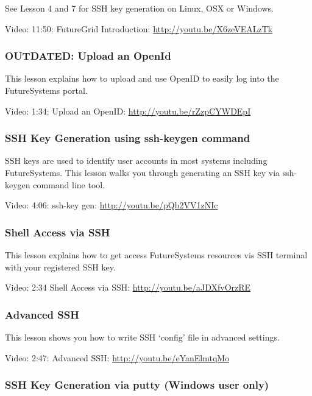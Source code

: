 See Lesson 4 and 7 for SSH key generation on Linux, OSX or Windows.

Video: 11:50: FutureGrid Introduction: \url{http://youtu.be/X6zeVEALzTk}

\subsubsection{OUTDATED: Upload an
OpenId}\label{outdated-upload-an-openid}

This lesson explains how to upload and use OpenID to easily log into the
FutureSystems portal.

Video: 1:34: Upload an OpenID: \url{http://youtu.be/rZzpCYWDEpI}

\subsubsection{SSH Key Generation using ssh-keygen
command}\label{ssh-key-generation-using-ssh-keygen-command}

SSH keys are used to identify user accounts in most systems including
FutureSystems. This lesson walks you through generating an SSH key via
ssh-keygen command line tool.

Video: 4:06: ssh-key gen: \url{http://youtu.be/pQb2VV1zNIc}

\subsubsection{Shell Access via SSH}\label{shell-access-via-ssh}

This lesson explains how to get access FutureSystems resources vis SSH
terminal with your registered SSH key.

Video: 2:34 Shell Access via SSH: \url{http://youtu.be/aJDXfvOrzRE}

\subsubsection{Advanced SSH}\label{advanced-ssh}

This lesson shows you how to write SSH `config' file in advanced
settings.

Video: 2:47: Advanced SSH: \url{http://youtu.be/eYanElmtqMo}

\subsubsection{SSH Key Generation via putty (Windows user
only)}\label{ssh-key-generation-via-putty-windows-user-only}

